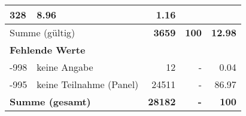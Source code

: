 \begin{longtable}{lXrrr}
       \num{328} &
       \num[round-mode=places,round-precision=2]{8.96} &
         \num[round-mode=places,round-precision=2]{1.16} \\
     \midrule
     \multicolumn{2}{l}{Summe (gültig)} &
       \textbf{\num{3659}} &
     \textbf{\num{100}} &
       \textbf{\num[round-mode=places,round-precision=2]{12.98}} \\
     \multicolumn{5}{l}{\textbf{Fehlende Werte}}\\
       -998 &
       keine Angabe &
         \num{12} &
        - &
         \num[round-mode=places,round-precision=2]{0.04} \\
       -995 &
       keine Teilnahme (Panel) &
         \num{24511} &
        - &
         \num[round-mode=places,round-precision=2]{86.97} \\
     \midrule
     \multicolumn{2}{l}{\textbf{Summe (gesamt)}} &
          \textbf{\num{28182}} &
        \textbf{-} &
        \textbf{\num{100}} \\
     \bottomrule
     \end{longtable}
     
